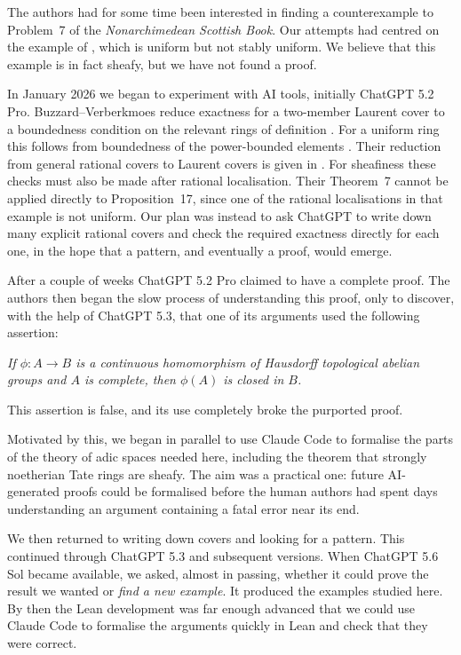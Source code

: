 \documentclass[11pt,reqno]{amsart}
\theoremstyle{definition}
\begin{document}
The authors had for some time been interested in finding a counterexample to
Problem~7 of the \emph{Nonarchimedean Scottish Book}.  Our attempts had
centred on the example of
\cite[Section~4.5, Proposition~17]{BV}, which is uniform but not stably
uniform.  We believe that this example is in fact sheafy, but we have not
found a proof.

In January 2026 we began to experiment with AI tools, initially ChatGPT 5.2
Pro.  Buzzard--Verberkmoes reduce exactness for a two-member Laurent cover to
a boundedness condition on the relevant rings of definition
\cite[Lemma~2]{BV}.  For a uniform ring this follows from boundedness of the
power-bounded elements \cite[Lemma~3 and Corollary~4]{BV}.  Their reduction
from general rational covers to Laurent covers is given in
\cite[Lemma~8 and the proof of Theorem~7]{BV}.  For sheafiness these checks
must also be made after rational localisation.  Their Theorem~7 cannot be
applied directly to Proposition~17, since one of the rational localisations
in that example is not uniform.  Our plan was instead to ask ChatGPT to
write down many explicit rational covers and check the required exactness
directly for each one, in the hope that a pattern, and eventually a proof,
would emerge.

After a couple of weeks ChatGPT 5.2 Pro claimed to have a complete proof.
The authors then began the slow process of understanding this proof, only to
discover, with the help of ChatGPT 5.3, that one of its arguments used the
following assertion:

\emph{If $\phi:A\to B$ is a continuous homomorphism of Hausdorff
topological abelian groups and $A$ is complete, then $\phi(A)$ is closed in
$B$.}

This assertion is false, and its use completely broke the purported proof.

Motivated by this, we began in parallel to use Claude Code to formalise the
parts of the theory of adic spaces needed here, including the theorem that
strongly noetherian Tate rings are sheafy.  The aim was a practical one:
future AI-generated proofs could be formalised before the human authors had
spent days understanding an argument containing a fatal error near its end.

We then returned to writing down covers and looking for a pattern.  This
continued through ChatGPT 5.3 and subsequent versions.  When ChatGPT 5.6 Sol
became available, we asked, almost in passing, whether it could prove the
result we wanted or \emph{find a new example}.  It produced the examples
studied here.  By then the Lean development was far enough advanced that we
could use Claude Code to formalise the arguments quickly in Lean and check
that they were correct.
\end{document}
